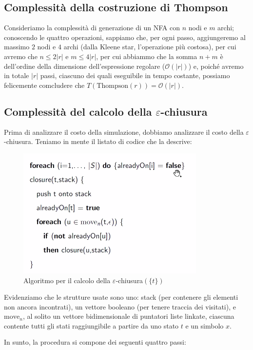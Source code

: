 \documentclass[class=book, crop=false, oneside, 12pt]{standalone}
\begin{document}
\subsection{Complessità della costruzione di Thompson}
Consideriamo la  complessità di generazione di un NFA con \(n\) nodi e \(m\) archi; conoscendo le quattro operazioni, sappiamo che, per ogni passo, aggiungeremo al massimo \(2\) nodi e \(4\) archi (dalla Kleene star, l'operazione più costosa), per cui avremo che \(n \le 2|r|\) e \(m \le 4|r|\), per cui abbiammo che la somma \(n + m\) è dell'ordine della dimensione dell'espressione regolare (\(\mathcal{O}(|r|)\)) e, poiché avremo in totale \(|r|\) passi, ciascuno dei quali eseguibile in tempo costante, possiamo felicemente comcludere che \(T(\textrm{Thompson}(r)) = \mathcal{O}(|r|)\).

\subsection{Complessità del calcolo della \(\varepsilon\)-chiusura}
Prima di analizzare il costo della simulazione, dobbiamo analizzare il costo della \(\varepsilon\)-chiusura. Teniamo in mente il listato di codice che la descrive:

\begin{figure}
    \centering
    \includegraphics[width=.6\textwidth,keepaspectratio]{algoritmo_epsilon_chiusura}
    \caption{Algoritmo per il calcolo della \(\varepsilon\)-chiusura\((\{t\})\)}
    \label{algoritmo_epsilon_chiusura}
\end{figure}

\noindent Evidenziamo che le strutture usate sono uno: stack (per contenere gli elementi non ancora incontrati), un vettore booleano (per tenere traccia dei visitati), e \(
\textrm{move}_n\), al solito un vettore bidimensionale di puntatori liste linkate, ciascuna contente tutti gli stati raggiungibile a partire da uno stato \(t\) e un simbolo \(x\).

In sunto, la procedura si compone dei seguenti quattro passi:
\end{document}
